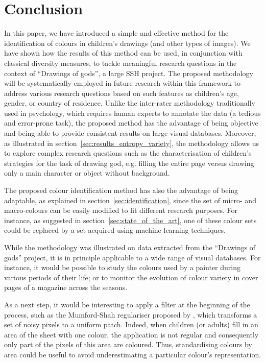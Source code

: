 \documentclass[11pt,a4paper]{article}
\begin{document}
\section{Conclusion}
\label{sec:conclusion}
In this paper, we have introduced a simple and effective method for the identification of colours in children's drawings (and other types of images). We have shown how the results of this method can be used, in conjunction with classical diversity measures, to tackle meaningful research questions in the context of ``Drawings of gods'', a large SSH project. The proposed methodology will be systematically employed in future research within this framework to address various research questions based on such features as children's age, gender, or country of residence. Unlike the inter-rater methodology traditionally used in psychology, which requires human experts to annotate the data (a tedious and error-prone task), the proposed method has the advantage of being objective and being able to provide consistent results on large visual databases. Moreover, as illustrated in section~\ref{sec:results_entropy_variety}, the methodology allows us to explore complex research questions such as the characterisation of children's strategies for the task of drawing god, e.g. filling the entire page versus drawing only a main character or object without background.

The proposed colour identification method has also the advantage of being adaptable, as explained in section~\ref{sec:identification}, since the set of micro- and macro-colours can be easily modified to fit different research purposes. For instance, as suggested in section~\ref{sec:state_of_the_art}, one of these colour sets could be replaced by a set acquired using machine learning techniques.

While the methodology was illustrated on data extracted from the ``Drawings of gods'' project, it is in principle applicable to a wide range of visual databases. For instance, it would be possible to study the colours used by a painter during various periods of their life; or to monitor the evolution of colour variety in cover pages of a magazine across the seasons.

As a next step, it would be interesting to apply a filter at the beginning of the process, such as the Mumford-Shah regulariser proposed by \citet{erdem2009}, which transforms a set of noisy pixels to a uniform patch. Indeed, when children (or adults) fill in an area of the sheet with one colour, the application is not regular and consequently only part of the pixels of this area are coloured. Thus, standardising colours by area could be useful to avoid underestimating a particular colour's representation.




\end{document}
